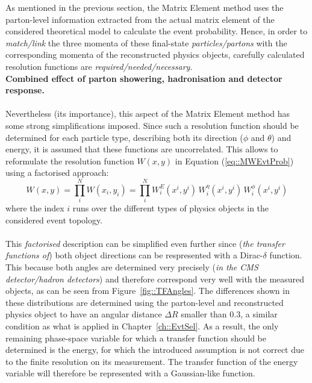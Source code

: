 As mentioned in the previous section, the Matrix Element method uses the parton-level information extracted from the actual matrix element of the considered theoretical model to calculate the event probability.
Hence, in order to \textit{match/link} the three momenta of these final-state \textit{particles/partons} with the corresponding momenta of the reconstructed physics objects, carefully calculated resolution functions are \textit{required/needed/necessary}. 
\\
\textbf{Combined effect of parton showering, hadronisation and detector response.}
\\
\\
Nevertheless (its importance), this aspect of the Matrix Element method has some strong simplifications imposed.
Since such a resolution function should be determined for each particle type, describing both its direction ($\phi$ and $\theta$) and energy, it is assumed that these functions are uncorrelated.
This allows to reformulate the resolution function $W(x,y)$ in Equation (\ref{eq::MWEvtProb}) using a factorised approach:
\begin{equation}
 W(x,y) = \prod_{i}^{N} W(x_i, y_i) = \prod_{i}^{N} W_{i}^{E}(x^{i},y^i) \, W_{i}^{\eta}(x^i, y^i) \, W_{i}^{\phi}(x^i,y^i)
\end{equation}
where the index $i$ runs over the different types of physics objects in the considered event topology.
\\
\\
This \textit{factorised} description can be simplified even further since (\textit{the transfer functions of}) both object directions can be respresented with a Dirac-$\delta$ function.
This because both angles are determined very precisely (\textit{in the CMS detector/hadron detectors}) and therefore correspond very well with the measured objects, as can be seen from Figure~\ref{fig::TFAngles}. The differences shown in these distributions are determined using the parton-level and reconstructed physics object to have an angular distance $\Delta R$ smaller than 0.3, a similar condition as what is applied in Chapter~\ref{ch::EvtSel}.
As a result, the only remaining phase-space variable for which a transfer function should be determined is the energy, for which the introduced assumption is not correct due to the finite resolution on its measurement. The transfer function of the energy variable will therefore be represented with a Gaussian-like function.
\\
